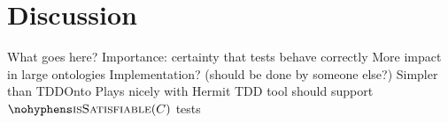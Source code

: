 \documentclass[paper.tex]{subfiles}
\begin{document}
\section{Discussion}
\label{sec:discussion}

\begin{todos}
  \todo What goes here?
  \todo Importance: certainty that tests behave correctly
  \todo More impact in large ontologies
  \todo Implementation? (should be done by someone else?)
  \todo Simpler than TDDOnto
  \todo Plays nicely with Hermit
  \todo TDD tool should support $\textproc{isSatisfiable}(C)$ tests
\end{todos}
\end{document}
